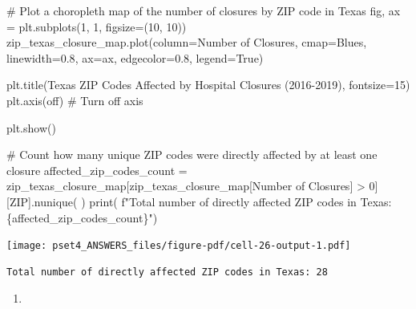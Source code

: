 \documentclass[
  letterpaper,
  DIV=11,
  numbers=noendperiod]{scrartcl}
\newenvironment{Shaded}{\begin{snugshade}}{\end{snugshade}}
\newcommand{\BuiltInTok}[1]{\textcolor[rgb]{0.00,0.23,0.31}{#1}}
\newcommand{\CommentTok}[1]{\textcolor[rgb]{0.37,0.37,0.37}{#1}}
\newcommand{\DecValTok}[1]{\textcolor[rgb]{0.68,0.00,0.00}{#1}}
\newcommand{\FloatTok}[1]{\textcolor[rgb]{0.68,0.00,0.00}{#1}}
\newcommand{\NormalTok}[1]{\textcolor[rgb]{0.00,0.23,0.31}{#1}}
\newcommand{\OperatorTok}[1]{\textcolor[rgb]{0.37,0.37,0.37}{#1}}
\newcommand{\SpecialCharTok}[1]{\textcolor[rgb]{0.37,0.37,0.37}{#1}}
\newcommand{\SpecialStringTok}[1]{\textcolor[rgb]{0.13,0.47,0.30}{#1}}
\newcommand{\StringTok}[1]{\textcolor[rgb]{0.13,0.47,0.30}{#1}}
\newcommand{\VariableTok}[1]{\textcolor[rgb]{0.07,0.07,0.07}{#1}}
\providecommand{\tightlist}{%
  \setlength{\itemsep}{0pt}\setlength{\parskip}{0pt}}\usepackage{longtable,booktabs,array}
\begin{document}
\begin{Shaded}
\begin{Highlighting}[]
\CommentTok{\# Plot a choropleth map of the number of closures by ZIP code in Texas}
\NormalTok{fig, ax }\OperatorTok{=}\NormalTok{ plt.subplots(}\DecValTok{1}\NormalTok{, }\DecValTok{1}\NormalTok{, figsize}\OperatorTok{=}\NormalTok{(}\DecValTok{10}\NormalTok{, }\DecValTok{10}\NormalTok{))}
\NormalTok{zip\_texas\_closure\_map.plot(column}\OperatorTok{=}\StringTok{\textquotesingle{}Number of Closures\textquotesingle{}}\NormalTok{, cmap}\OperatorTok{=}\StringTok{\textquotesingle{}Blues\textquotesingle{}}\NormalTok{,}
\NormalTok{                           linewidth}\OperatorTok{=}\FloatTok{0.8}\NormalTok{, ax}\OperatorTok{=}\NormalTok{ax, edgecolor}\OperatorTok{=}\StringTok{\textquotesingle{}0.8\textquotesingle{}}\NormalTok{, legend}\OperatorTok{=}\VariableTok{True}\NormalTok{)}

\NormalTok{plt.title(}\StringTok{\textquotesingle{}Texas ZIP Codes Affected by Hospital Closures (2016{-}2019)\textquotesingle{}}\NormalTok{, fontsize}\OperatorTok{=}\DecValTok{15}\NormalTok{)}
\NormalTok{plt.axis(}\StringTok{\textquotesingle{}off\textquotesingle{}}\NormalTok{)  }\CommentTok{\# Turn off axis}

\NormalTok{plt.show()}

\CommentTok{\# Count how many unique ZIP codes were directly affected by at least one closure}
\NormalTok{affected\_zip\_codes\_count }\OperatorTok{=}\NormalTok{ zip\_texas\_closure\_map[zip\_texas\_closure\_map[}\StringTok{\textquotesingle{}Number of Closures\textquotesingle{}}\NormalTok{] }\OperatorTok{\textgreater{}} \DecValTok{0}\NormalTok{][}\StringTok{\textquotesingle{}ZIP\textquotesingle{}}\NormalTok{].nunique(}
\NormalTok{)}
\BuiltInTok{print}\NormalTok{(}
    \SpecialStringTok{f"Total number of directly affected ZIP codes in Texas: }\SpecialCharTok{\{}\NormalTok{affected\_zip\_codes\_count}\SpecialCharTok{\}}\SpecialStringTok{"}\NormalTok{)}
\end{Highlighting}
\end{Shaded}

\texttt{[image: pset4\_ANSWERS\_files/figure-pdf/cell-26-output-1.pdf]}

\begin{verbatim}
Total number of directly affected ZIP codes in Texas: 28
\end{verbatim}

\begin{enumerate}
\def\labelenumi{\arabic{enumi}.}
\setcounter{enumi}{2}
\tightlist
\item
\end{enumerate}
\end{document}
